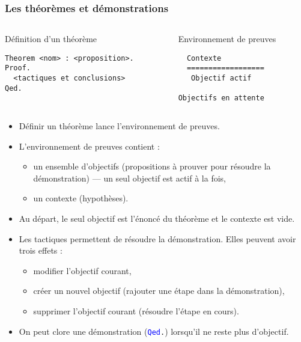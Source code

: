 \documentclass[9pt,handout]{beamer}
\newenvironment{code}[1][Code]{\begin{block}{#1}}{\end{block}}
\newcommand{\coq}[1]{\texttt{\textcolor{blue}{#1}}}
\begin{document}
\begin{frame}[containsverbatim]
\frametitle{Les théorèmes et démonstrations}

\begin{columns}[t]
  \begin{column}{5cm}
    \begin{code}[Définition d'un théorème]
    \begin{lstlisting}
Theorem <nom> : <proposition>.
Proof.
  <tactiques et conclusions>
Qed.
    \end{lstlisting}
    \end{code}
  \end{column}
  \begin{column}{5cm}
    \begin{code}[Environnement de preuves]
    \begin{lstlisting}
  Contexte
  ==================
   Objectif actif

Objectifs en attente
    \end{lstlisting}
    \end{code}
  \end{column}
\end{columns} 

\begin{itemize}
  \item Définir un théorème lance l'environnement de preuves.
  \item L'environnement de preuves contient :
  \begin{itemize}
   \item un ensemble d'objectifs (propositions à prouver pour résoudre la démonstration) --- un seul objectif est actif à la fois,
   \item un contexte (hypothèses).
  \end{itemize}
  \item Au départ, le seul objectif est l'énoncé du théorème et le contexte est vide.
  \item Les tactiques permettent de résoudre la démonstration. Elles peuvent avoir trois effets :
  \begin{itemize}
    \item modifier l'objectif courant,
    \item créer un nouvel objectif (rajouter une étape dans la démonstration),
    \item supprimer l'objectif courant (résoudre l'étape en cours).
  \end{itemize}
  \item On peut clore une démonstration (\coq{Qed}\texttt{.}) lorsqu'il ne reste plus d'objectif.
\end{itemize}

\end{frame}
\end{document}
